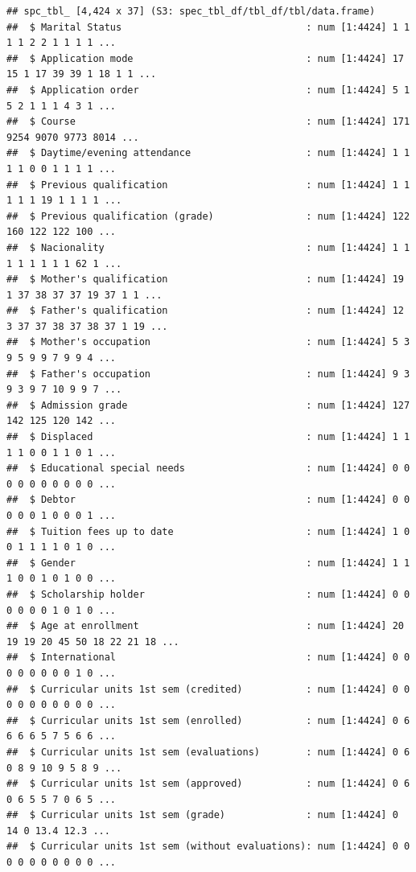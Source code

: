 \documentclass[
]{article}
\begin{document}
\begin{verbatim}
## spc_tbl_ [4,424 x 37] (S3: spec_tbl_df/tbl_df/tbl/data.frame)
##  $ Marital Status                                : num [1:4424] 1 1 1 1 2 2 1 1 1 1 ...
##  $ Application mode                              : num [1:4424] 17 15 1 17 39 39 1 18 1 1 ...
##  $ Application order                             : num [1:4424] 5 1 5 2 1 1 1 4 3 1 ...
##  $ Course                                        : num [1:4424] 171 9254 9070 9773 8014 ...
##  $ Daytime/evening attendance                    : num [1:4424] 1 1 1 1 0 0 1 1 1 1 ...
##  $ Previous qualification                        : num [1:4424] 1 1 1 1 1 19 1 1 1 1 ...
##  $ Previous qualification (grade)                : num [1:4424] 122 160 122 122 100 ...
##  $ Nacionality                                   : num [1:4424] 1 1 1 1 1 1 1 1 62 1 ...
##  $ Mother's qualification                        : num [1:4424] 19 1 37 38 37 37 19 37 1 1 ...
##  $ Father's qualification                        : num [1:4424] 12 3 37 37 38 37 38 37 1 19 ...
##  $ Mother's occupation                           : num [1:4424] 5 3 9 5 9 9 7 9 9 4 ...
##  $ Father's occupation                           : num [1:4424] 9 3 9 3 9 7 10 9 9 7 ...
##  $ Admission grade                               : num [1:4424] 127 142 125 120 142 ...
##  $ Displaced                                     : num [1:4424] 1 1 1 1 0 0 1 1 0 1 ...
##  $ Educational special needs                     : num [1:4424] 0 0 0 0 0 0 0 0 0 0 ...
##  $ Debtor                                        : num [1:4424] 0 0 0 0 0 1 0 0 0 1 ...
##  $ Tuition fees up to date                       : num [1:4424] 1 0 0 1 1 1 1 0 1 0 ...
##  $ Gender                                        : num [1:4424] 1 1 1 0 0 1 0 1 0 0 ...
##  $ Scholarship holder                            : num [1:4424] 0 0 0 0 0 0 1 0 1 0 ...
##  $ Age at enrollment                             : num [1:4424] 20 19 19 20 45 50 18 22 21 18 ...
##  $ International                                 : num [1:4424] 0 0 0 0 0 0 0 0 1 0 ...
##  $ Curricular units 1st sem (credited)           : num [1:4424] 0 0 0 0 0 0 0 0 0 0 ...
##  $ Curricular units 1st sem (enrolled)           : num [1:4424] 0 6 6 6 6 5 7 5 6 6 ...
##  $ Curricular units 1st sem (evaluations)        : num [1:4424] 0 6 0 8 9 10 9 5 8 9 ...
##  $ Curricular units 1st sem (approved)           : num [1:4424] 0 6 0 6 5 5 7 0 6 5 ...
##  $ Curricular units 1st sem (grade)              : num [1:4424] 0 14 0 13.4 12.3 ...
##  $ Curricular units 1st sem (without evaluations): num [1:4424] 0 0 0 0 0 0 0 0 0 0 ...

\end{verbatim}
\end{document}
